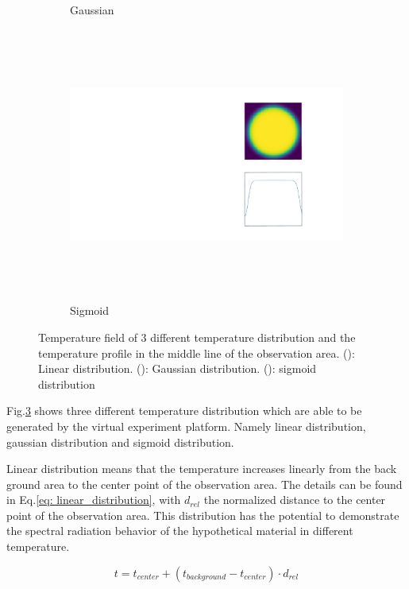 \begin{figure}[htbp]
\begin{subfigure}{0.3\textwidth}
        \caption{Gaussian}
        \label{fig: gaussian_distribution}        
    \end{subfigure}
    \begin{subfigure}{0.3\textwidth}
        \centering
        \includegraphics[height=9cm]{figures/temp_distribution_c.pdf}
        \caption{Sigmoid}
        \label{fig: sigmoid_distribution}        
    \end{subfigure}
    \caption{Temperature field of 3 different temperature distribution and the 
    temperature profile in the middle line of the observation area. (): 
    Linear distribution. (): Gaussian distribution. 
    (): sigmoid distribution}
    \label{fig: temperature_profile}
\end{figure}


Fig.\ref{fig: temperature_profile} shows three different temperature distribution 
which are able to be generated by the virtual experiment platform. Namely linear 
distribution, gaussian distribution and sigmoid distribution.


Linear distribution means that the temperature increases linearly from the back ground 
area to the center point of the observation area. The details can be found in 
Eq.\ref{eq: linear_distribution}, with $d_{rel}$ the normalized distance to the center point 
of the observation area. This distribution has the potential to 
demonstrate the spectral radiation behavior of the hypothetical material in 
different temperature. 


\begin{equation}
    t = t_{center} + (t_{background} - t_{center}) \cdot d_{rel}
    \label{eq: linear_distribution}
\end{equation}


